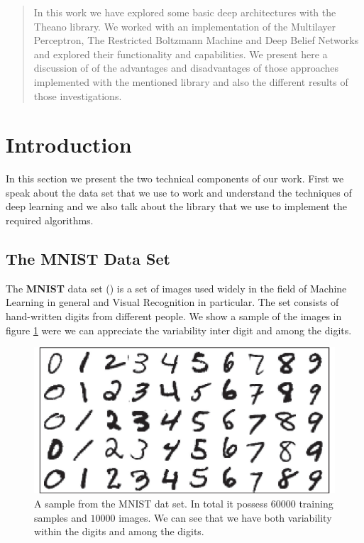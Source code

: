 \documentclass[11pt,a4paper]{article}
\begin{document}
\begin{abstract}
In this work we have explored some basic deep architectures with the Theano library. We worked with an implementation of the Multilayer Perceptron, The Restricted Boltzmann Machine and Deep Belief Networks and explored their functionality and capabilities. We present here a discussion of of the advantages and disadvantages of those approaches implemented with the mentioned library and also the different results of those investigations.
\end{abstract}

\section{Introduction}

In this section we present the two technical components of our work. First we speak about the data set that we use to work and understand the techniques of deep learning and we also talk about the library that we use to implement the required algorithms. 

\subsection{The MNIST Data Set}
The \textbf{MNIST}  data set (\cite{lecun1998mnist}) is a set of images used widely in the field of Machine Learning in general and Visual Recognition in particular. The set consists of hand-written digits from different people. We show a sample of the images in figure \ref{fig:mnist_example} were we can appreciate the variability inter digit and among the digits. 

\begin{center}
\begin{figure}[H]
\centering
\includegraphics[scale=.45]{mnist_example.png} 
\caption{A sample from the MNIST dat set. In total it possess $60000$ training samples and $10000$ images.  We can see that we have both variability within the digits and among the digits.}
\label{fig:mnist_example}
\end{figure} 
\end{center}
\end{document}
